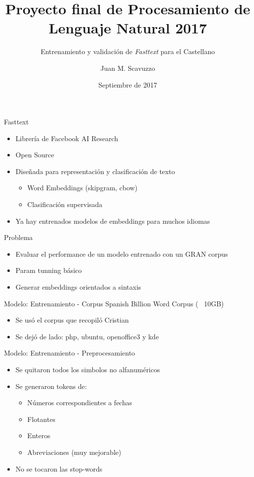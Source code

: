 \documentclass[10pt]{beamer}
\title{Proyecto final de Procesamiento de Lenguaje Natural 2017}
\subtitle{Entrenamiento y validación de \textit{Fasttext} para el Castellano}
\date{Septiembre de 2017}
\author{Juan M. Scavuzzo}
\begin{document}
\maketitle



\begin{frame}{Fasttext}
  \begin{itemize}[<+->]
    \item Librería de Facebook AI Research %
    \item Open Source
    \item Diseñada para representación y clasificación de texto
      \begin{itemize}[<+->]
        \item Word Embeddings (skipgram, cbow)
        \item Clasificación supervisada
      \end{itemize}
   \item Ya hay entrenados modelos de embeddings para muchos idiomas
  \end{itemize}
\end{frame}


\begin{frame}{Problema}
    \begin{itemize}[<+->]
      \item Evaluar el performance de un modelo entrenado con un GRAN corpus
      \item Param tunning básico
      \item Generar embeddings orientados a sintaxis
    \end{itemize}
\end{frame}


\begin{frame}{Modelo: Entrenamiento - Corpus}
  Spanish Billion Word Corpus (~ 10GB)
  \begin{itemize}[<+->]
    \item Se usó el corpus que recopiló Cristian
    \item Se dejó de lado: php, ubuntu, openoffice3 y kde
  \end{itemize}
\end{frame}


\begin{frame}{Modelo: Entrenamiento - Preprocesamiento}
  \begin{itemize}[<+->]
      \item Se quitaron todos los simbolos no alfanuméricos
      \item Se generaron tokens de:
        \begin{itemize}[<+->]
          \item Números correspondientes a fechas
          \item Flotantes
          \item Enteros
          \item Abreviaciones (muy mejorable)
        \end{itemize}
      \item No se tocaron las stop-words
  \end{itemize}

\end{frame}
\end{document}
